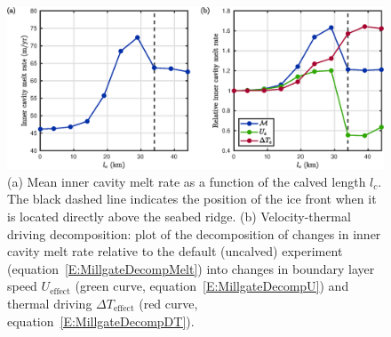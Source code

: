 \documentclass[draft]{agujournal2019}
\begin{document}
\begin{figure}
    \centering
    \includegraphics[width = \textwidth]{../make_figures/plots/figure4.eps}
    \caption{(a) Mean inner cavity melt rate as a function of the calved length $l_c$. The black dashed line indicates the position of the ice front when it is located directly above the seabed ridge. (b) Velocity-thermal driving decomposition: plot of the decomposition of changes in inner cavity melt rate relative to the default (uncalved) experiment (equation~\eqref{E:MillgateDecompMelt}) into changes in boundary layer speed $U_\text{effect}$ (green curve, equation~\eqref{E:MillgateDecompU}) and thermal driving $\Delta T_{\text{effect}}$ (red curve, equation~\eqref{E:MillgateDecompDT}).}
    \label{fig:figure4}
\end{figure}
\end{document}
